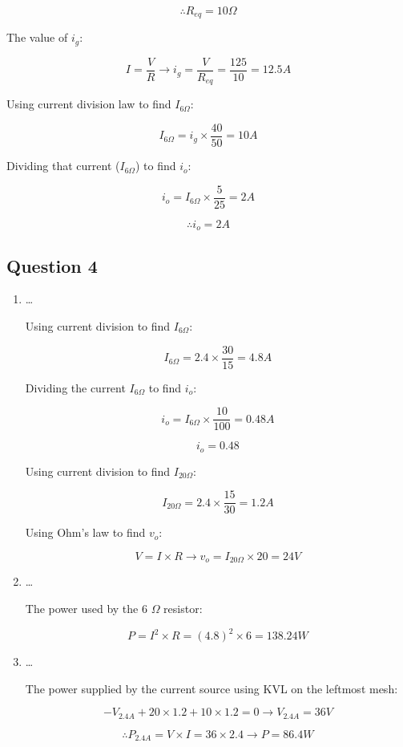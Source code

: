 \documentclass[11pt]{article}
\begin{document}
$$\therefore \boxed{R_{eq} = 10 \Omega}$$

The value of \(i_g\):

$$I = \frac{V}{R} \to i_{g} = \frac{V}{R_{eq}} = \frac{125}{10} = 12.5A$$

Using current division law to find \(I_{6 \Omega}\):

$$I_{6\Omega} = i_{g} \times \frac{40}{50} = 10A$$

Dividing that current (\(I_{6\Omega}\)) to find \(i_o\):

$$i_{o} = I_{6\Omega} \times \frac{5}{25} = 2A$$

$$\therefore \boxed{i_o = 2A}$$
\subsection{Question 4}
\label{sec:orgc24084c}

\begin{enumerate}
\item \ldots{}

Using current division to find \(I_{6\Omega}\):

$$I_{6\Omega} = 2.4 \times \frac{30}{15} = 4.8A$$

Dividing the current \(I_{6\Omega}\) to find \(i_o\):

$$i_o = I_{6\Omega} \times \frac{10}{100} = 0.48A$$

$$\boxed{i_{o} = 0.48}$$

Using current division to find \(I_{20\Omega}\):

$$I_{20 \Omega} = 2.4 \times \frac{15}{30} = 1.2A$$

Using Ohm's law to find \(v_o\):

$$V = I \times R \to v_{o} = I_{20\Omega} \times 20 = 24V$$

\item \ldots{}

The power used by the 6 \(\Omega\) resistor:

$$P = I^2 \times R = (4.8)^2 \times 6 = 138.24 W$$

\item \ldots{}

The power supplied by the current source using KVL on the leftmost mesh:

$$-V_{2.4A} + 20 \times 1.2 + 10 \times 1.2 = 0 \to V_{2.4A} = 36V$$

$$\therefore P_{2.4A} = V \times I = 36 \times 2.4 \to \boxed{P = 86.4 W}$$
\end{enumerate}
\end{document}

